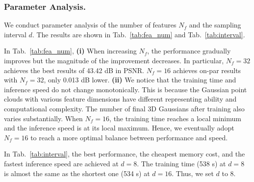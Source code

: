 \documentclass[runningheads]{llncs}
\begin{document}
\begin{table}[t]
        \vspace{-1mm}
	\caption{Ablation study. PSNR, SSIM, training time, and inference speed are reported.}
	\label{tab:ablations}
	\vspace{-7mm}
\end{table}



\vspace{-4mm}
\subsubsection{Parameter Analysis.} 
We conduct parameter analysis of the number of features $N_f$ and the sampling interval $d$. The results are shown in Tab.~\ref{tab:fea_num} and Tab.~\ref{tab:interval}. 

In Tab.~\ref{tab:fea_num}, \textbf{(i)} When increasing $N_f$, the performance gradually improves but the magnitude of the improvement decreases. In particular, $N_f = 32$ achieves the best results of 43.42 dB in PSNR. $N_f = 16$ achieves on-par results with $N_f = 32$, only 0.013 dB lower. \textbf{(ii)} We notice that the training time and inference speed do not change monotonically. This is because the Gaussian point clouds with various feature dimensions have different representing ability and computational complexity. The number of final 3D Gaussians after training also varies substantially. When $N_f = 16$, the training time reaches a local minimum and the inference speed is at its local maximum. Hence, we eventually adopt $N_f = 16$ to reach a more optimal balance between performance and speed. 

In Tab.~\ref{tab:interval}, the best performance, the cheapest memory cost, and the fastest inference speed are achieved at $d = 8$. The training time (538 s) at $d = 8$ is almost the same as the shortest one (534 s) at $d = 16$. Thus, we set $d$ to 8.
\end{document}
